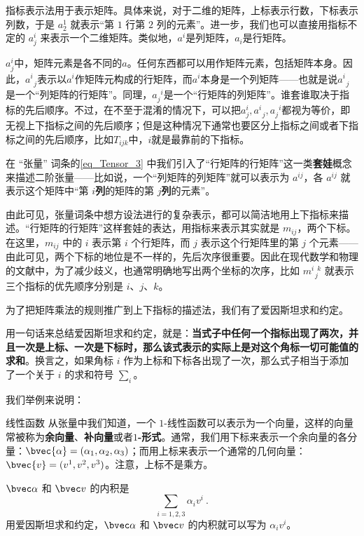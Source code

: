 指标表示法用于表示矩阵。具体来说，对于二维的矩阵，上标表示行数，下标表示列数，于是 $a^1_2$ 就表示“第 $1$ 行第 $2$ 列的元素”。进一步，我们也可以直接用指标不定的 $a^i_j$ 来表示一个二维矩阵。类似地，$a^i$是列矩阵，$a_i$是行矩阵。

$a^i_j$中，矩阵元素是各不同的$a$。任何东西都可以用作矩阵元素，包括矩阵本身。因此，$a^{i}_{\phantom{1}j}$表示以$a^i$作矩阵元构成的行矩阵，而$a^i$本身是一个列矩阵——也就是说$a^i_{\phantom{1}j}$是一个“列矩阵的行矩阵”。同理，$a^{\phantom{1}i}_j$是一个“行矩阵的列矩阵”。谁套谁取决于指标的先后顺序。不过，在不至于混淆的情况下，可以把$a^i_j, a^i_{\phantom{1}j}, a^{\phantom{1}i}_j$都视为等价，即无视上下指标之间的先后顺序；但是这种情况下通常也要区分上指标之间或者下指标之间的先后顺序，比如$T_{ijk}$中，$i$就是最靠前的下指标。

在 “张量” 词条的\autoref{eq_Tensor_3} 中我们引入了“行矩阵的行矩阵”这一类\textbf{套娃}概念来描述二阶张量——比如说，一个“列矩阵的列矩阵”就可以表示为 $a^{ij}$，各 $a^{ij}$ 就表示这个矩阵中“第 $i$\textbf{列}的矩阵的第 $j$\textbf{列}的元素”。

由此可见，张量词条中想方设法进行的复杂表示，都可以简洁地用上下指标来描述。“行矩阵的行矩阵”这样套娃的表达，用指标来表示其实就是 $m_{ij}$，两个下标。在这里，$m_{ij}$ 中的 $i$ 表示第 $i$ 个行矩阵，而 $j$ 表示这个行矩阵里的第 $j$ 个元素——由此可见，两个下标的地位是不一样的，先后次序很重要。因此在现代数学和物理的文献中，为了减少歧义，也通常明确地写出两个坐标的次序，比如 $m^{i\phantom{1}k}_{\phantom{1}j}$ 就表示三个指标的优先顺序分别是 $i$、$j$、$k$。

为了把矩阵乘法的规则推广到上下指标的描述法，我们有了爱因斯坦求和约定。

用一句话来总结爱因斯坦求和约定，就是：\textbf{当式子中任何一个指标出现了两次，并且一次是上标、一次是下标时，那么该式表示的实际上是对这个角标一切可能值的求和}。换言之，如果角标 $i$ 作为上标和下标各出现了一次，那么式子相当于添加了一个关于 $i$ 的求和符号 $\sum_i$。

我们举例来说明：

\begin{example}{线性函数}
从张量中我们知道，一个 $1$-线性函数可以表示为一个向量，这样的向量常被称为\textbf{余向量}、\textbf{补向量}或者\textbf{$1$-形式}。通常，我们用下标来表示一个余向量的各分量：$\bvec{\alpha}=(\alpha_1, \alpha_2, \alpha_3)$；而用上标来表示一个通常的几何向量：$\bvec{v}=(v^1, v^2, v^3)$。注意，上标不是乘方。

$\bvec\alpha$ 和 $\bvec v$ 的内积是$$\sum\limits_{i=1, 2, 3}\alpha_i v^i~.$$
用爱因斯坦求和约定，$\bvec\alpha$ 和 $\bvec v$ 的内积就可以写为 $\alpha_i v^i$。
\end{example}

